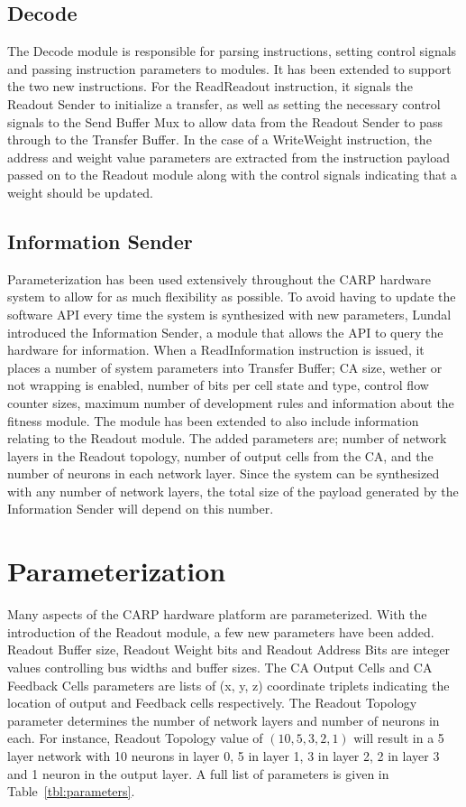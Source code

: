 \subsection{Decode}

The Decode module is responsible for parsing instructions, setting control
signals and passing instruction parameters to modules. It has been extended to
support the two new instructions. For the ReadReadout instruction, it signals the
Readout Sender to initialize a transfer, as well as setting the necessary
control signals to the Send Buffer Mux to allow data from the Readout Sender to
pass through to the Transfer Buffer. In the case of a WriteWeight instruction,
the address and weight value parameters are extracted from the instruction
payload passed on to the Readout module along with the control signals
indicating that a weight should be updated.

\subsection{Information Sender}

Parameterization has been used extensively throughout the CARP hardware system
to allow for as much flexibility as possible. To avoid having to update the
software API every time the system is synthesized with new parameters, Lundal
introduced the Information Sender, a module that allows the API to query the
hardware for information. When a ReadInformation instruction is issued, it
places a number of system parameters into Transfer Buffer; CA size, wether or
not wrapping is enabled, number of bits per cell state and type, control flow
counter sizes, maximum number of development rules and information about the
fitness module. The module has been extended to also include information
relating to the Readout module. The added parameters are; number of network
layers in the Readout topology, number of output cells from the CA, and the
number of neurons in each network layer. Since the system can be synthesized
with any number of network layers, the total size of the payload generated by
the Information Sender will depend on this number.

\section{Parameterization}
\label{sec:parameterization}

Many aspects of the CARP hardware platform are parameterized. With the
introduction of the Readout module, a few new parameters have been added.
Readout Buffer size, Readout Weight bits and Readout Address Bits are integer
values controlling bus widths and buffer sizes. The CA Output Cells and CA
Feedback Cells parameters are lists of (x, y, z) coordinate triplets indicating
the location of output and Feedback cells respectively. The Readout Topology
parameter determines the number of network layers and number of neurons in each.
For instance, Readout Topology value of $(10, 5, 3, 2, 1)$ will result in a 5
layer network with 10 neurons in layer 0, 5 in layer 1, 3 in layer 2, 2 in layer
3 and 1 neuron in the output layer. A full list of parameters is given in
Table~\ref{tbl:parameters}.

